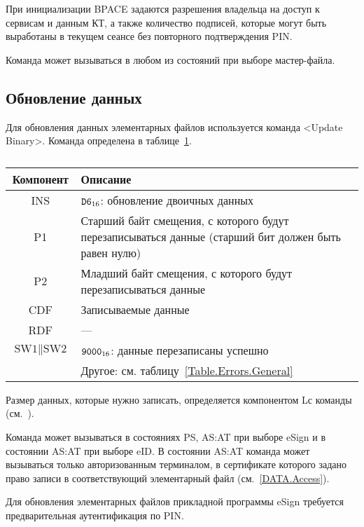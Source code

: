 При инициализации BPACE задаются разрешения 
владельца на доступ к сервисам и данным  
КТ, а также количество подписей, которые могут быть выработаны 
в текущем сеансе без повторного подтверждения PIN.

Команда может вызываться в любом из состояний при выборе мастер-файла.

\subsection{Обновление данных}
\label{Oper.Descr.Update}

Для обновления данных элементарных файлов используется команда <Update Binary>.
Команда определена в таблице~\ref{Table.Oper.UpdateCmd}.

\begin{table}[hbt]
\caption{}\label{Table.Oper.UpdateCmd}
\begin{tabular}{|c|p{14cm}|}
\hline
Компонент & Описание\\
\hline
\hline
INS & $\texttt{D6}_{16}$: обновление двоичных данных\\
\hline
P1 & Старший байт смещения, с которого будут перезаписываться данные 
(старший бит должен быть равен нулю)\\
\hline
P2 & Младший байт смещения, с которого будут перезаписываться данные \\
\hline
CDF & Записываемые данные \\
\hline 
\hline
RDF &  --- \\
\hline
$\text{SW1} \parallel \text{SW2}$ & 
$\texttt{9000}_{16}$: данные перезаписаны успешно \\
\cline{2-2}
 & Другое: см. таблицу~\ref{Table.Errors.General} \\
\hline
\end{tabular}
\end{table}

Размер данных, которые нужно записать, определяется компонентом Lс команды 
(см.~\cite{APDU}).

Команда может вызываться в состояниях PS, AS:AT 
при выборе eSign и в состоянии AS:AT при выборе eID.
В состоянии AS:AT команда может вызываться только 
авторизованным терминалом, в сертификате которого
задано право записи в соответствующий элементарный 
файл (см.~\ref{DATA.Access}).

Для обновления элементарных файлов прикладной программы eSign 
требуется предварительная аутентификация по PIN.


